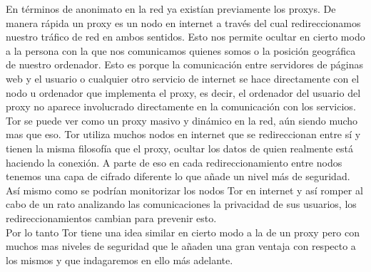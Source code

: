 En términos de anonimato en la red ya existían previamente los proxys. De manera rápida un proxy es un nodo en internet a través del cual redireccionamos nuestro tráfico de red en ambos sentidos. Esto nos permite ocultar en cierto modo a la persona con la que nos comunicamos quienes somos o la posición geográfica de nuestro ordenador. Esto es porque la comunicación entre servidores de páginas web y el usuario o cualquier otro servicio de internet se hace directamente con el nodo u ordenador que implementa el proxy, es decir, el ordenador del usuario del proxy no aparece involucrado directamente en la comunicación con los servicios.\\
Tor se puede ver como un proxy masivo y dinámico en la red, aún siendo mucho mas que eso. Tor utiliza muchos nodos en internet que se redireccionan entre sí y tienen la misma filosofía que el proxy, ocultar los datos de quien realmente está haciendo la conexión. A parte de eso en cada redireccionamiento entre nodos tenemos una capa de cifrado diferente lo que añade un nivel más de seguridad. Así mismo como se podrían monitorizar los nodos Tor en internet y así romper al cabo de un rato analizando las comunicaciones la  privacidad de sus usuarios, los redireccionamientos cambian para prevenir esto.\\
Por lo tanto Tor tiene una idea similar en cierto modo a la de un proxy pero con muchos mas niveles de seguridad que le añaden una gran ventaja con respecto a los mismos y que indagaremos en ello más adelante.